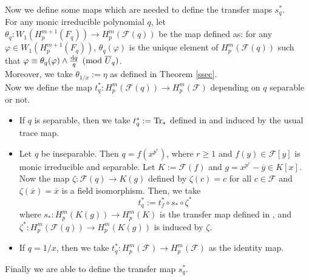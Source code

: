 \documentclass[times,10pt]{amsart}
\newcommand{\dd}{{\rm d}}
\newcommand{\F}{\ensuremath{\mathcal{F}}}
\renewcommand{\phi}{\varphi}
\begin{document}
 Now we define some maps which  are needed to define the transfer maps $s_q^*$.\\

  For any monic irreducible polynomial  $q$, let  $ \theta_q: W_1(H_p^{m+1}(F_q))\xrightarrow{}  H_p^m(\F(q))$  be the map defined as:    for any $\phi\in W_1(H_p^{m+1}(F_q))$, $\theta_q(\phi)$ is the unique element of  $H_p^m(\F(q))$ such that $ \phi\equiv \theta_q(\phi)\wedge \frac{\dd q}{q}\pmod{\overline{U}_q}$.\\
               
  Moreover, we take  $\theta_{1/x}:= \eta$ as defined in Theorem \ref{ssec}.\\

  Now we define  the map $t_q^*: H_p^m(\F(q))\xrightarrow{} H_p^m(\F)$ depending on   $q$ separable or not.\begin{itemize}
\item If $q$ is separable, then we take {$t_q^*:= \rm{Tr}_*$}  defined in \cite[Corollary 2.9]{AAB} {and induced by the usual trace map}.
\item Let $q$ be inseparable. Then $q= f(  x^{p^r})$, where $r\geq 1$ and $f(y)\in \F[y]$ is monic irreducible and separable. Let  $K:=\F(f)$ and $g=x^{p^r}-\overline{y}\in K[x]$. Now   the map $ \zeta:\F(q)\xrightarrow{}  K(g)$ defined by $\zeta(c)=c$ for all $c\in \F$ and $\zeta(\overline{x})=\overline{x}$ is a field isomorphism. Then, we take $$ t_q^*:= t_f^*\circ s_*\circ \zeta^*$$ where $s_*: H_p^m(K(g))\xrightarrow{} H_p^m(K)$ is {the transfer map defined in \cite[Proposition 3.4]{ALO}, and }$\zeta^*: H_p^{m}(\F(q))\xrightarrow{} H_p^m(K(g))$ is induced by $\zeta$.           
\item If $q=1/x$, then we take $ t_{q}^*: H_p^m(\F)\xrightarrow{} H_p^m(\F)$ as the identity map.\end{itemize}
Finally we are able to define the transfer map $s_q^*$.
\end{document}
